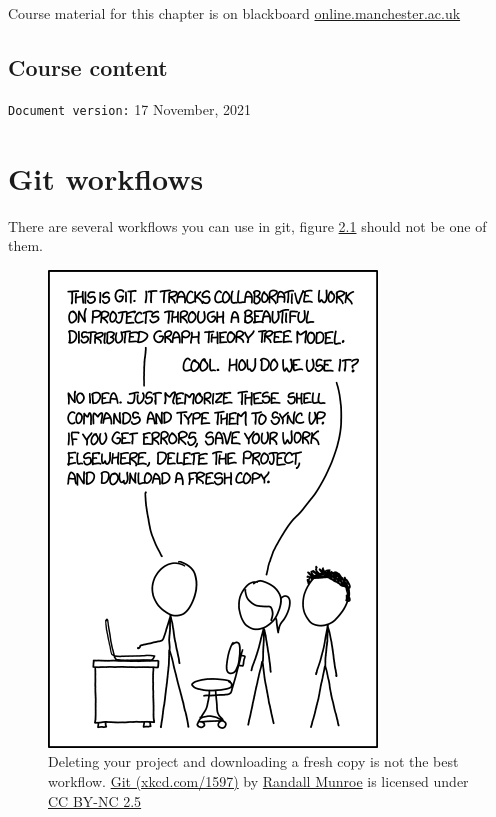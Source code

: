 \documentclass[
]{book}
\begin{document}
Course material for this chapter is on blackboard \href{https://online.manchester.ac.uk}{online.manchester.ac.uk}

\hypertarget{course-content-1}{%
\section{Course content}\label{course-content-1}}

\texttt{Document\ version:} 17 November, 2021

\hypertarget{flowing}{%
\chapter{Git workflows}\label{flowing}}

There are several workflows you can use in git, figure \ref{fig:xkcd-git-fig} should not be one of them.

\begin{figure}

{\centering \includegraphics[width=0.55\linewidth]{images/git} 

}

\caption{Deleting your project and downloading a fresh copy is not the best workflow. \href{https://xkcd.com/1597/}{Git (xkcd.com/1597)} by \href{https://en.wikipedia.org/wiki/Randall_Munroe}{Randall Munroe} is licensed under \href{https://creativecommons.org/licenses/by-nc/2.5/}{CC BY-NC 2.5}}\label{fig:xkcd-git-fig}
\end{figure}
\end{document}
